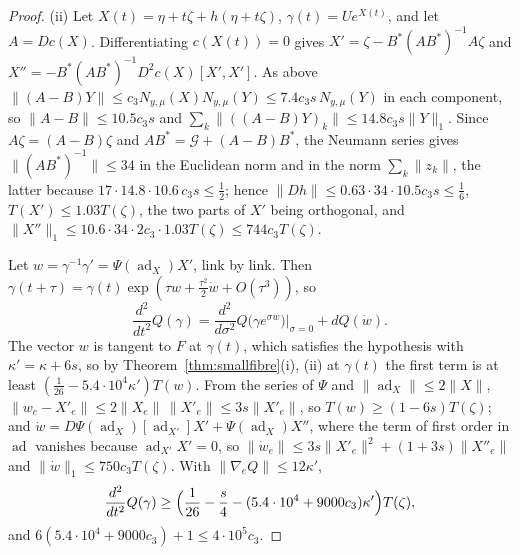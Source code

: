 \documentclass[11pt]{amsart}
\theoremstyle{definition}
\theoremstyle{remark}
\numberwithin{equation}{section}
\begin{document}
\begin{proof}
(ii) Let $X(t)=\eta+t\zeta+h(\eta+t\zeta)$, $\gamma(t)=Ue^{X(t)}$, and let
$A=Dc(X)$. Differentiating $c(X(t))=0$ gives $X'=\zeta-B^*(AB^*)^{-1}A\zeta$
and $X''=-B^*(AB^*)^{-1}D^2c(X)[X',X']$. As above $\lVert(A-B)Y\rVert\le
c_3N_{y,\mu}(X)N_{y,\mu}(Y)\le7.4c_3s\,N_{y,\mu}(Y)$ in each component, so
$\lVert A-B\rVert\le10.5c_3s$ and $\sum_k\lVert((A-B)Y)_k\rVert\le14.8c_3s
\lVert Y\rVert_1$. Since $A\zeta=(A-B)\zeta$ and $AB^*=\mathcal G+(A-B)B^*$,
the Neumann series gives $\lVert(AB^*)^{-1}\rVert\le34$ in the Euclidean
norm and in the norm $\sum_k\lVert z_k\rVert$, the latter because $17
\cdot14.8\cdot10.6\,c_3s\le\frac12$; hence $\lVert Dh\rVert\le0.63\cdot34
\cdot10.5c_3s\le\frac16$, $T(X')\le1.03T(\zeta)$, the two parts of $X'$
being orthogonal, and $\lVert X''\rVert_1\le10.6\cdot34\cdot2c_3\cdot1.03
T(\zeta)\le744c_3T(\zeta)$.

Let $w=\gamma^{-1}\gamma'=\Psi(\operatorname{ad}_X)X'$, link by link. Then
$\gamma(t+\tau)=\gamma(t)\exp(\tau w+\frac{\tau^2}2\dot w+O(\tau^3))$, so
\[
\frac{d^2}{dt^2}Q(\gamma)=\frac{d^2}{d\sigma^2}Q\bigl(\gamma e^{\sigma w}
\bigr)\Big|_{\sigma=0}+dQ(\dot w).
\]
The vector $w$ is tangent to $F$ at $\gamma(t)$, which satisfies the
hypothesis with $\kappa'=\kappa+6s$, so by Theorem~\ref{thm:smallfibre}(i),
(ii) at $\gamma(t)$ the first term is at least $(\frac1{26}-5.4\cdot10^4
\kappa')T(w)$. From the series of $\Psi$ and $\lVert\operatorname{ad}_X
\rVert\le2\lVert X\rVert$, $\lVert w_e-X'_e\rVert\le2\lVert X_e\rVert\,
\lVert X'_e\rVert\le3s\lVert X'_e\rVert$, so $T(w)\ge(1-6s)T(\zeta)$; and
$\dot w=D\Psi(\operatorname{ad}_X)[\operatorname{ad}_{X'}]X'+\Psi(
\operatorname{ad}_X)X''$, where the term of first order in
$\operatorname{ad}$ vanishes because $\operatorname{ad}_{X'}X'=0$, so $\lVert
\dot w_e\rVert\le3s\lVert X'_e\rVert^2+(1+3s)\lVert X''_e\rVert$ and $\lVert
\dot w\rVert_1\le750c_3T(\zeta)$. With $\lVert\nabla_eQ\rVert\le12\kappa'$,
\[
\frac{d^2}{dt^2}Q(\gamma)\ge\Bigl(\frac1{26}-\frac s4-(5.4\cdot10^4+9000
c_3)\kappa'\Bigr)T(\zeta),
\]
and $6(5.4\cdot10^4+9000c_3)+1\le4\cdot10^5c_3$.


\end{proof}
\end{document}
